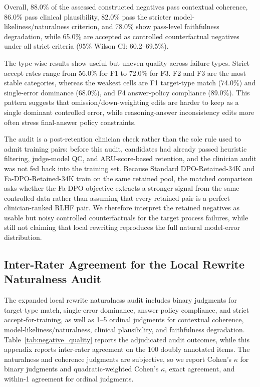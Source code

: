 \documentclass[a4paper,fleqn,doubleblind]{cas-sc}
\begin{document}
Overall, 88.0\% of the assessed constructed negatives pass contextual coherence, 86.0\% pass clinical plausibility, 82.0\% pass the stricter model-likeliness/naturalness criterion, and 78.0\% show pass-level faithfulness degradation, while 65.0\% are accepted as controlled counterfactual negatives under all strict criteria (95\% Wilson CI: 60.2--69.5\%).

The type-wise results show useful but uneven quality across failure types. Strict accept rates range from 56.0\% for F1 to 72.0\% for F3. F2 and F3 are the most stable categories, whereas the weakest cells are F1 target-type match (74.0\%) and single-error dominance (68.0\%), and F4 answer-policy compliance (89.0\%). This pattern suggests that omission/down-weighting edits are harder to keep as a single dominant controlled error, while reasoning-answer inconsistency edits more often stress final-answer policy constraints.

The audit is a post-retention clinician check rather than the sole rule used to admit training pairs: before this audit, candidates had already passed heuristic filtering, judge-model QC, and ARU-score-based retention, and the clinician audit was not fed back into the training set. Because Standard DPO-Retained-34K and Fa-DPO-Retained-34K train on the same retained pool, the matched comparison asks whether the Fa-DPO objective extracts a stronger signal from the same controlled data rather than assuming that every retained pair is a perfect clinician-ranked RLHF pair. We therefore interpret the retained negatives as usable but noisy controlled counterfactuals for the target process failures, while still not claiming that local rewriting reproduces the full natural model-error distribution.

\subsection{Inter-Rater Agreement for the Local Rewrite Naturalness Audit}
\label{app:ordinal_agreement}

The expanded local rewrite naturalness audit includes binary judgments for target-type match, single-error dominance, answer-policy compliance, and strict accept-for-training, as well as 1--5 ordinal judgments for contextual coherence, model-likeliness/naturalness, clinical plausibility, and faithfulness degradation. Table~\ref{tab:negative_quality} reports the adjudicated audit outcomes, while this appendix reports inter-rater agreement on the 100 doubly annotated items. The naturalness and coherence judgments are subjective, so we report Cohen's $\kappa$ for binary judgments and quadratic-weighted Cohen's $\kappa$, exact agreement, and within-1 agreement for ordinal judgments.
\end{document}

